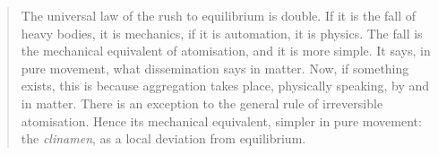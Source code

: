 \documentclass{scrartcl}
\begin{document}
	\vspace{0.25cm}
	
	\begin{quote}
		{\small The universal law of the rush to equilibrium is double. If it is the fall of heavy bodies, it is mechanics, if it is automation, it is physics. The fall is the mechanical equivalent of atomisation, and it is more simple. It says, in pure movement, what dissemination says in matter. Now, if something exists, this is because aggregation takes place, physically speaking, by and in matter. There is an exception to the general rule of irreversible atomisation. Hence its mechanical equivalent, simpler in pure movement: the \textit{clinamen}, as a local deviation from equilibrium.}
	\end{quote}
	
\end{document}
